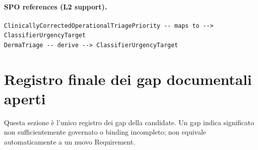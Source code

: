 \documentclass[11pt,a4paper]{article}
\begin{document}
\paragraph{SPO references (L2 support).}
\begin{lstlisting}
ClinicallyCorrectedOperationalTriagePriority -- maps to --> ClassifierUrgencyTarget
DermaTriage -- derive --> ClassifierUrgencyTarget
\end{lstlisting}


\clearpage
\section{Registro finale dei gap documentali aperti}

Questa sezione è l'unico registro dei gap della candidate. Un gap indica significato non sufficientemente governato o binding incompleto; non equivale automaticamente a un nuovo Requirement.
\end{document}
